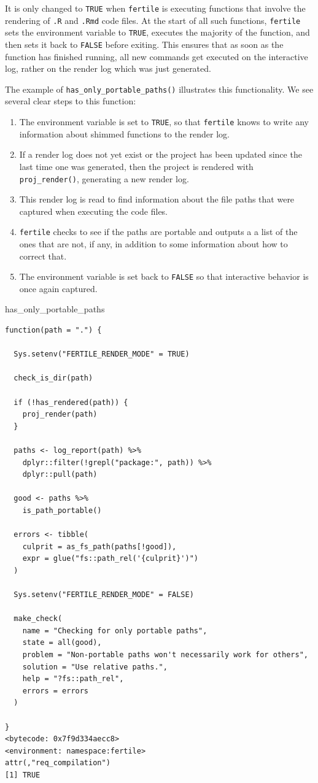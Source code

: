 \documentclass[12pt,twoside]{reedthesis}
\newenvironment{Shaded}{\begin{snugshade}}{\end{snugshade}}
\newcommand{\NormalTok}[1]{#1}
\begin{document}
It is only changed to \texttt{TRUE} when \texttt{fertile} is executing
functions that involve the rendering of \texttt{.R} and \texttt{.Rmd}
code files. At the start of all such functions, \texttt{fertile} sets
the environment variable to \texttt{TRUE}, executes the majority of the
function, and then sets it back to \texttt{FALSE} before exiting. This
ensures that as soon as the function has finished running, all new
commands get executed on the interactive log, rather on the render log
which was just generated.

The example of \texttt{has\_only\_portable\_paths()} illustrates this
functionality. We see several clear steps to this function:
\begin{enumerate}
\def\labelenumi{\arabic{enumi}.}
\item
  The environment variable is set to \texttt{TRUE}, so that
  \texttt{fertile} knows to write any information about shimmed
  functions to the render log.
\item
  If a render log does not yet exist or the project has been updated
  since the last time one was generated, then the project is rendered
  with \texttt{proj\_render()}, generating a new render log.
\item
  This render log is read to find information about the file paths that
  were captured when executing the code files.
\item
  \texttt{fertile} checks to see if the paths are portable and outputs a
  a list of the ones that are not, if any, in addition to some
  information about how to correct that.
\item
  The environment variable is set back to \texttt{FALSE} so that
  interactive behavior is once again captured.
\end{enumerate}
\begin{Shaded}
\begin{Highlighting}[]
\NormalTok{has_only_portable_paths}
\end{Highlighting}
\end{Shaded}
\begin{verbatim}
function(path = ".") {

  Sys.setenv("FERTILE_RENDER_MODE" = TRUE)

  check_is_dir(path)

  if (!has_rendered(path)) {
    proj_render(path)
  }

  paths <- log_report(path) %>%
    dplyr::filter(!grepl("package:", path)) %>%
    dplyr::pull(path)

  good <- paths %>%
    is_path_portable()

  errors <- tibble(
    culprit = as_fs_path(paths[!good]),
    expr = glue("fs::path_rel('{culprit}')")
  )

  Sys.setenv("FERTILE_RENDER_MODE" = FALSE)

  make_check(
    name = "Checking for only portable paths",
    state = all(good),
    problem = "Non-portable paths won't necessarily work for others",
    solution = "Use relative paths.",
    help = "?fs::path_rel",
    errors = errors
  )

}
<bytecode: 0x7f9d334aecc8>
<environment: namespace:fertile>
attr(,"req_compilation")
[1] TRUE
\end{verbatim}
\end{document}
